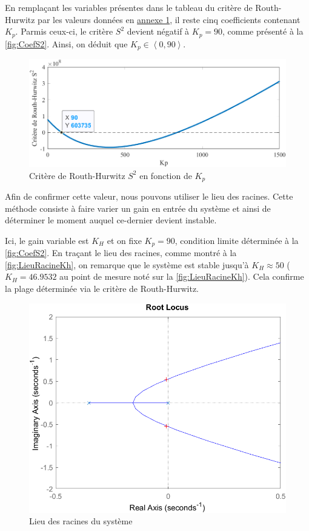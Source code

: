 \documentclass[a4paper,12pt]{article}
\begin{document}
    En remplaçant les variables présentes dans le tableau du critère de Routh-Hurwitz par les valeurs données en \hyperref[Annexe:ValList]{annexe 1}, il reste cinq coefficients contenant $K_p$. Parmis ceux-ci, le critère $S^2$ devient négatif à $K_p = 90$, comme présenté à la \autoref{fig:CoefS2}. Ainsi, on déduit que $K_p \in \left< 0, 90 \right>$.
    \begin{figure}[H]
        \centering
        \includegraphics[width=16cm]{./img/plage_coefKp.png}
        \caption{Critère de Routh-Hurwitz $S^2$ en fonction de $K_p$\label{fig:CoefS2}}
    \end{figure}

    Afin de confirmer cette valeur, nous pouvons utiliser le lieu des racines. Cette méthode consiste à faire varier un gain en entrée du système et ainsi de déterminer le moment auquel ce-dernier devient instable.
    
    Ici, le gain variable est $K_H$ et on fixe $K_p = 90$, condition limite déterminée à la \autoref{fig:CoefS2}. En traçant le lieu des racines, comme montré à la \autoref{fig:LieuRacineKh}, on remarque que le système est stable jusqu'à $K_H \approx 50$ ($K_H = 46.9532$ au point de mesure noté sur la \autoref{fig:LieuRacineKh}). Cela confirme la plage déterminée via le critère de Routh-Hurwitz.
    \begin{figure}[H]
        \centering
        \includegraphics[width=13cm]{./img/planRacine_Kh.png}
        \caption{Lieu des racines du système\label{fig:LieuRacineKh}}
    \end{figure}
\end{document}
